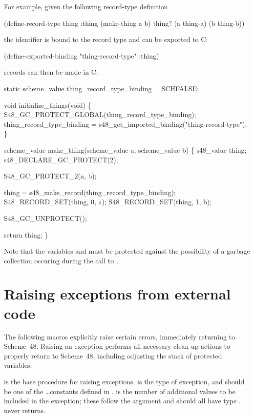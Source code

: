 For example, given the following record-type definition
\begin{example}
(define-record-type thing :thing
  (make-thing a b)
  thing?
  (a thing-a)
  (b thing-b))
\end{example}
 the identifier  is bound to the record type and can
 be exported to C:
\begin{example}
(define-exported-binding "thing-record-type" :thing)
\end{example}
 records can then be made in C:
\begin{example}
static scheme_value
  thing_record_type_binding = SCHFALSE;

void initialize_things(void)
\{
  S48_GC_PROTECT_GLOBAL(thing_record_type_binding);
  thing_record_type_binding =
     s48_get_imported_binding("thing-record-type");
\}

scheme_value make_thing(scheme_value a, scheme_value b)
\{
  s48_value thing;
  s48_DECLARE_GC_PROTECT(2);

  S48_GC_PROTECT_2(a, b);

  thing = s48_make_record(thing_record_type_binding);
  S48_RECORD_SET(thing, 0, a);
  S48_RECORD_SET(thing, 1, b);

  S48_GC_UNPROTECT();

  return thing;
\}
\end{example}
Note that the variables  and  must be protected
 against the possibility of a garbage collection occuring during
 the call to .

\section{Raising exceptions from external code}
\label{sec:exceptions}

The following macros explicitly raise certain errors, immediately
 returning to Scheme~48.
Raising an exception performs all
 necessary clean-up actions to properly return to Scheme~48, including
 adjusting the stack of protected variables.

\begin{protos}
\end{protos}

\noindent{} is the base procedure for
 raising exceptions.
 is the type of exception, and should be one of the
 \ldots constants defined in .
 is the number of additional values to be included in the
 exception; these follow the  argument and should all have
 type .
 never returns.
 
